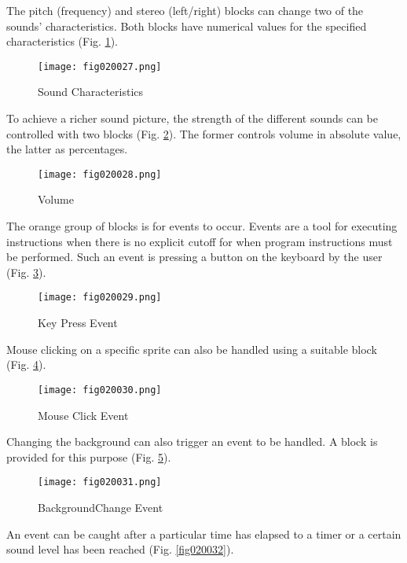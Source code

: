 The pitch (frequency) and stereo (left/right) blocks can change two of the sounds' characteristics. Both blocks have numerical values for the specified characteristics (Fig. \ref{fig020027}).

\begin{figure}[H]
   \centering
   \texttt{[image: fig020027.png]}
   \caption{Sound Characteristics}
\label{fig020027}
\end{figure}

To achieve a richer sound picture, the strength of the different sounds can be controlled with two blocks (Fig. \ref{fig020028}). The former controls volume in absolute value, the latter as percentages.

\begin{figure}[H]
   \centering
   \texttt{[image: fig020028.png]}
   \caption{Volume}
\label{fig020028}
\end{figure}

The orange group of blocks is for events to occur. Events are a tool for executing instructions when there is no explicit cutoff for when program instructions must be performed. Such an event is pressing a button on the keyboard by the user (Fig. \ref{fig020029}).

\begin{figure}[H]
   \centering
   \texttt{[image: fig020029.png]}
   \caption{Key Press Event}
\label{fig020029}
\end{figure}

Mouse clicking on a specific sprite can also be handled using a suitable block (Fig. \ref{fig020030}).

\begin{figure}[H]
   \centering
   \texttt{[image: fig020030.png]}
   \caption{Mouse Click Event}
\label{fig020030}
\end{figure}

Changing the background can also trigger an event to be handled. A block is provided for this purpose (Fig. \ref{fig020031}).

\begin{figure}[H]
   \centering
   \texttt{[image: fig020031.png]}
   \caption{BackgroundChange Event}
\label{fig020031}
\end{figure}

An event can be caught after a particular time has elapsed to a timer or a certain sound level has been reached (Fig. \ref{fig020032}).

